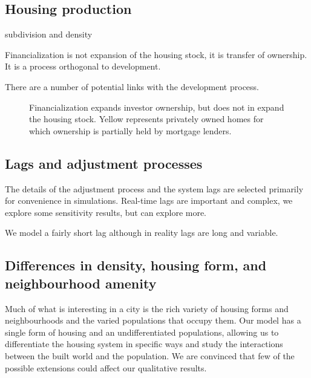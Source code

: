 \subsection{Housing production}
subdivision and density


Financialization is not expansion of the housing stock, it is transfer of ownership. It is a process orthogonal to development.

There are a number of potential links with the development process.

\begin{figure}
\begin{center}

\end{center}
\caption{Financialization expands investor ownership, but does not in expand the housing stock. Yellow represents privately owned homes for which ownership is partially held by mortgage lenders.}
\label{fig-financialization-expansion}
\end{figure}


\subsection{Lags and adjustment processes}
The details of the adjustment process and the system lags are selected primarily for convenience in simulations. Real-time lags are important and complex, we explore some sensitivity results, but can explore more. 

We model a fairly short lag although in reality lags are long and variable. 


\subsection{Differences in density, housing form, and neighbourhood amenity}

Much of what is interesting in a city is the rich variety of housing forms and neighbourhoods and the varied populations that occupy them. Our model has a single form of housing and an undifferentiated populations, allowing us to differentiate the housing system in specific ways and study the interactions between the built world and the population. We are convinced that few of the possible extensions could affect our qualitative results. 

